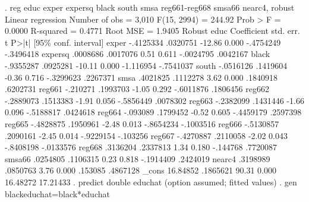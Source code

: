 . reg educ exper expersq black south smsa reg661-reg668 smsa66 nearc4, robust
{\smallskip}
Linear regression                               Number of obs     =      3,010
                                                F(15, 2994)       =     244.92
                                                Prob > F          =     0.0000
                                                R-squared         =     0.4771
                                                Root MSE          =     1.9405
{\smallskip}
             {\VBAR}               Robust
        educ {\VBAR} Coefficient  std. err.      t    P>|t|     [95\% conf. interval]
       exper {\VBAR}  -.4125334   .0320751   -12.86   0.000    -.4754249   -.3496418
     expersq {\VBAR}   .0008686   .0017076     0.51   0.611    -.0024795    .0042167
       black {\VBAR}  -.9355287   .0925281   -10.11   0.000    -1.116954   -.7541037
       south {\VBAR}  -.0516126   .1419604    -0.36   0.716    -.3299623    .2267371
        smsa {\VBAR}   .4021825   .1112278     3.62   0.000     .1840918    .6202731
      reg661 {\VBAR}   -.210271   .1993703    -1.05   0.292    -.6011876    .1806456
      reg662 {\VBAR}  -.2889073   .1513383    -1.91   0.056    -.5856449    .0078302
      reg663 {\VBAR}  -.2382099   .1431446    -1.66   0.096    -.5188817    .0424618
      reg664 {\VBAR}   -.093089   .1799452    -0.52   0.605    -.4459179    .2597398
      reg665 {\VBAR}  -.4828875   .1950961    -2.48   0.013    -.8654234   -.1003516
      reg666 {\VBAR}  -.5130857   .2090161    -2.45   0.014    -.9229154    -.103256
      reg667 {\VBAR}  -.4270887   .2110058    -2.02   0.043    -.8408198   -.0133576
      reg668 {\VBAR}   .3136204   .2337813     1.34   0.180     -.144768    .7720087
      smsa66 {\VBAR}   .0254805   .1106315     0.23   0.818    -.1914409    .2424019
      nearc4 {\VBAR}   .3198989   .0850763     3.76   0.000      .153085    .4867128
       _cons {\VBAR}   16.84852   .1865621    90.31   0.000     16.48272    17.21433
{\smallskip}
. predict double educhat
(option {} assumed; fitted values)
{\smallskip}
. gen blackeduchat=black*educhat
{\smallskip}
